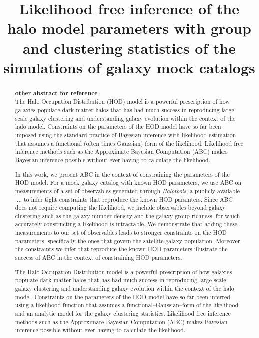 \documentclass[12pt, preprint]{aastex}
\begin{document}
\title{Likelihood free inference of the halo model parameters with group and clustering 
       statistics of the simulations of galaxy mock catalogs}

\begin{abstract}
{\bf other abstract for reference}\\
The Halo Occupation Distribution (HOD) model is a powerful prescription of how galaxies populate dark matter halos that has had much success in reproducing large scale galaxy clustering and understanding galaxy evolution within the context of the halo model. Constraints on the parameters of the HOD model have so far been imposed using the standard practice of Bayesian inference with likelihood estimation that assumes a functional (often times Gaussian) form of the likelihood. Likelihood free inference methods such as the Approximate Bayesian Computation (ABC) makes Bayesian inference possible without ever having to calculate the likelihood. 

In this work, we present ABC in the context of constraining the parameters of the HOD model. For a mock galaxy catalog with known HOD parameters, we use ABC on measurements of a set of observables generated through {\it Halotools}, a publicly available ..., to infer tight constraints that reproduce the known HOD paramters. Since ABC does not require computing the likelihood, we include observables beyond galaxy clustering such as the galaxy number density and the galaxy group richness, for which accurately constructing a likelihood is intractable. We demonstrate that adding these measurements to our set of observables leads to stronger constraints on the HOD parameters, 
 specifically the ones that govern the satellite galaxy population. Moreover, the constraints we infer that reproduce the known HOD parameters illustrate the success of ABC in the context of constraining HOD parameters.



The Halo Occupation Distribution model is a powerful prescription of how galaxies populate 
dark matter halos that has had much success in reproducing large scale galaxy clustering and understanding
galaxy evolution within the context of the halo model. Constraints on the parameters of the HOD model have 
so far been inferred using a likelihood function that assumes a functional--Gaussian--form of the likelihood
and an analytic model for the galaxy clustering statistics. Likelihood free inference methods such as the Approximate Bayesian Computation (ABC) makes Bayesian inference possible without ever having to calculate the likelihood. 


\end{abstract}
\end{document}
